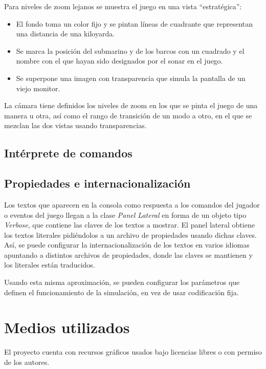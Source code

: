 \documentclass[a4paper,
	11pt,
	parskip=full,
	bibliography=totoc,
	twoside
	]{scrartcl}
\let\oldsection\section
\def\section{\cleardoubleoddpage\oldsection}
\begin{document}
			Para niveles de zoom lejanos se muestra el juego en una vista ``estratégica'':
			
			\begin{itemize}[noitemsep]
				\item El fondo toma un color fijo y se pintan líneas de cuadrante que representan una distancia de una kiloyarda.
				\item Se marca la posición del submarino y de los barcos con un cuadrado y el nombre con el que hayan sido designados por el sonar en el juego.
				\item Se superpone una imagen con transparencia que simula la pantalla de un viejo monitor.
			\end{itemize}
		
			La cámara tiene definidos los niveles de zoom en los que se pinta el juego de una manera u otra, así como el rango de transición de un modo a otro, en el que se mezclan las dos vistas usando transparencias.
	
	\subsection{Intérprete de comandos}
	\label{subsec:interprete_comandos}
	
	\subsection{Propiedades e internacionalización}
	\label{subsec:propiedades_internacionalizacion}
		Los textos que aparecen en la consola como respuesta a los comandos del jugador o eventos del juego llegan a la clase \textit{Panel Lateral} en forma de un objeto tipo \textit{Verbose}, que contiene las claves de los textos a mostrar. El panel lateral obtiene los textos literales pidiéndolos a un archivo de propiedades usando dichas claves. Así, se puede configurar la internacionalización de los textos en varios idiomas apuntando a distintos archivos de propiedades, donde las claves se mantienen y los literales están traducidos.
		
		Usando esta misma aproximación, se pueden configurar los parámetros que definen el funcionamiento de la simulación, en vez de usar codificación fija.
	
\section{Medios utilizados}
\label{sec:medios}
	El proyecto cuenta con recursos gráficos usados bajo licencias libres o con permiso de los autores.
	
\end{document}
